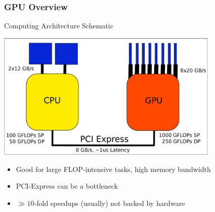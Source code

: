 

% 
%  
% 

\begin{frame}[fragile]
\frametitle{GPU Overview}
 \begin{block}{Computing Architecture Schematic}
  \begin{center}
   \includegraphics[width=0.8\textwidth]{figures/cpu-gpu-detail.pdf}
  \end{center}

 \begin{itemize}
  \item Good for large FLOP-intensive tasks, high memory bandwidth
  \item PCI-Express can be a bottleneck
  \item $\gg 10$-fold speedups (usually) not backed by hardware
 \end{itemize}
 \end{block}

\end{frame}

